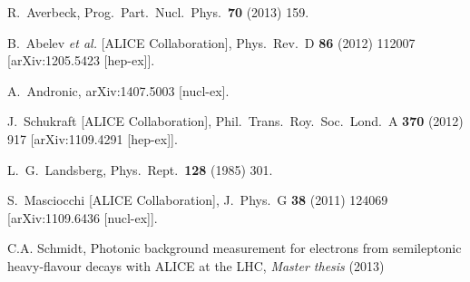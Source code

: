 \documentclass[a4paper,twocolumn,gsifonts,twoside]{gsipaper}
\begin{document}
\begin{thebibliography}{99}

  R.~Averbeck,
  Prog.\ Part.\ Nucl.\ Phys.\  {\bf 70} (2013) 159.

  B.~Abelev {\it et al.}  [ALICE Collaboration],
  Phys.\ Rev.\ D {\bf 86} (2012) 112007
  [arXiv:1205.5423 [hep-ex]].

  A.~Andronic,
  arXiv:1407.5003 [nucl-ex].
  
  J.~Schukraft [ALICE Collaboration],
  Phil.\ Trans.\ Roy.\ Soc.\ Lond.\ A {\bf 370} (2012) 917
  [arXiv:1109.4291 [hep-ex]].

  L.~G.~Landsberg,
  Phys.\ Rept.\  {\bf 128} (1985) 301.
  
  S.~Masciocchi [ALICE Collaboration],
  J.\ Phys.\ G {\bf 38} (2011) 124069
  [arXiv:1109.6436 [nucl-ex]].
  
 C.A. Schmidt, Photonic background measurement for electrons from semileptonic heavy-flavour decays with ALICE at the 
LHC, {\it Master thesis} (2013) 

\end{thebibliography}
\end{document}
